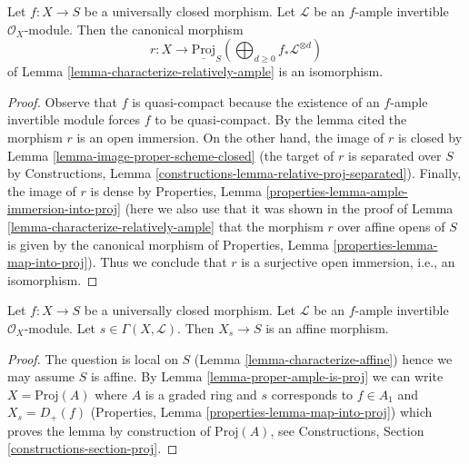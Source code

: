 \begin{lemma}
\label{lemma-proper-ample-is-proj}
Let $f : X \to S$ be a universally closed morphism.
Let $\mathcal{L}$ be an $f$-ample invertible $\mathcal{O}_X$-module.
Then the canonical morphism
$$
r : X
\longrightarrow
\underline{\text{Proj}}_S
\left(
\bigoplus\nolimits_{d \geq 0} f_*\mathcal{L}^{\otimes d}
\right)
$$
of Lemma \ref{lemma-characterize-relatively-ample} is an isomorphism.
\end{lemma}

\begin{proof}
Observe that $f$ is quasi-compact because the existence
of an $f$-ample invertible module forces $f$ to be quasi-compact.
By the lemma cited the morphism $r$ is an open immersion.
On the other hand, the image of $r$ is closed by
Lemma \ref{lemma-image-proper-scheme-closed}
(the target of $r$ is separated over $S$ by Constructions,
Lemma \ref{constructions-lemma-relative-proj-separated}).
Finally, the image of $r$ is dense by
Properties, Lemma \ref{properties-lemma-ample-immersion-into-proj}
(here we also use that it was shown in the proof of
Lemma \ref{lemma-characterize-relatively-ample}
that the morphism $r$ over affine opens of $S$
is given by the canonical morphism of
Properties, Lemma \ref{properties-lemma-map-into-proj}).
Thus we conclude that $r$ is a surjective open immersion, i.e.,
an isomorphism.
\end{proof}

\begin{lemma}
\label{lemma-proper-ample-delete-affine}
Let $f : X \to S$ be a universally closed morphism. Let $\mathcal{L}$
be an $f$-ample invertible $\mathcal{O}_X$-module. Let
$s \in \Gamma(X, \mathcal{L})$. Then $X_s \to S$ is an affine morphism.
\end{lemma}

\begin{proof}
The question is local on $S$ (Lemma \ref{lemma-characterize-affine})
hence we may assume $S$ is affine. By Lemma \ref{lemma-proper-ample-is-proj}
we can write $X = \text{Proj}(A)$ where $A$ is a graded
ring and $s$ corresponds to $f \in A_1$ and
$X_s = D_+(f)$ (Properties, Lemma \ref{properties-lemma-map-into-proj})
which proves the lemma by construction of $\text{Proj}(A)$, see
Constructions, Section \ref{constructions-section-proj}.
\end{proof}












